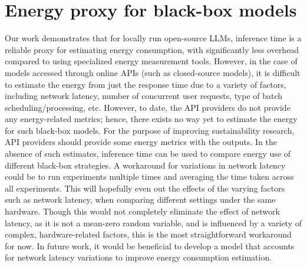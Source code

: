 \section{Energy proxy for black-box models}
\label{app:blackbox}
{
Our work demonstrates that for locally run open-source LLMs, inference time is a reliable proxy for estimating energy consumption, with significantly less overhead compared to using specialized energy measurement tools.
However, in the case of models accessed through online APIs (such as closed-source models), it is difficult to estimate the energy from just the response time due to a variety of factors, including network latency, number of concurrent user requests, type of batch scheduling/processing, etc. 
However, to date, the API providers do not provide any energy-related metrics; hence, there exists no way yet to estimate the energy for such black-box models. For the purpose of improving sustainability research, API providers should provide some energy metrics with the outputs.
In the absence of such estimates, inference time can be used to compare energy use of different black-box strategies. A workaround for variations in network latency could be to run experiments multiple times and averaging the time taken across all experiments. This will hopefully even out the effects of the varying factors such as network latency, when comparing different settings under the same hardware.
Though this would not completely eliminate the effect of network latency, as it is not a mean-zero random variable, and is influenced by a variety of complex, hardware-related factors, this is the most straightforward workaround for now.
In future work, it would be beneficial to develop a model that accounts for network latency variations to improve energy consumption estimation.
}
